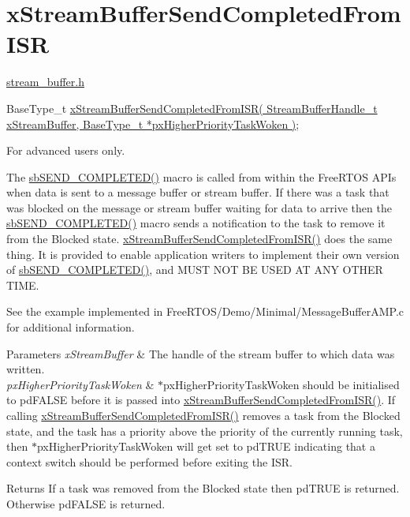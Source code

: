 \hypertarget{group__x_stream_buffer_send_completed_from_i_s_r}{}\section{x\+Stream\+Buffer\+Send\+Completed\+From\+I\+SR}
\label{group__x_stream_buffer_send_completed_from_i_s_r}
\hyperlink{stream__buffer_8h}{stream\+\_\+buffer.\+h}


\begin{DoxyPre}
BaseType\_t \hyperlink{stream__buffer_8h_abc37189e4eb8618f5434ae333dd50b23}{xStreamBufferSendCompletedFromISR( StreamBufferHandle\_t xStreamBuffer, BaseType\_t *pxHigherPriorityTaskWoken )};
\end{DoxyPre}


For advanced users only.

The \hyperlink{stream__buffer_8c_aa75273dfbcd92710254df0165ae1da5d}{sb\+S\+E\+N\+D\+\_\+\+C\+O\+M\+P\+L\+E\+T\+E\+D()} macro is called from within the Free\+R\+T\+OS A\+P\+Is when data is sent to a message buffer or stream buffer. If there was a task that was blocked on the message or stream buffer waiting for data to arrive then the \hyperlink{stream__buffer_8c_aa75273dfbcd92710254df0165ae1da5d}{sb\+S\+E\+N\+D\+\_\+\+C\+O\+M\+P\+L\+E\+T\+E\+D()} macro sends a notification to the task to remove it from the Blocked state. \hyperlink{stream__buffer_8h_abc37189e4eb8618f5434ae333dd50b23}{x\+Stream\+Buffer\+Send\+Completed\+From\+I\+S\+R()} does the same thing. It is provided to enable application writers to implement their own version of \hyperlink{stream__buffer_8c_aa75273dfbcd92710254df0165ae1da5d}{sb\+S\+E\+N\+D\+\_\+\+C\+O\+M\+P\+L\+E\+T\+E\+D()}, and M\+U\+ST N\+OT BE U\+S\+ED AT A\+NY O\+T\+H\+ER T\+I\+ME.

See the example implemented in Free\+R\+T\+O\+S/\+Demo/\+Minimal/\+Message\+Buffer\+A\+M\+P.\+c for additional information.


\begin{DoxyParams}{Parameters}
{\em x\+Stream\+Buffer} & The handle of the stream buffer to which data was written.\\
\hline
{\em px\+Higher\+Priority\+Task\+Woken} & $\ast$px\+Higher\+Priority\+Task\+Woken should be initialised to pd\+F\+A\+L\+SE before it is passed into \hyperlink{stream__buffer_8h_abc37189e4eb8618f5434ae333dd50b23}{x\+Stream\+Buffer\+Send\+Completed\+From\+I\+S\+R()}. If calling \hyperlink{stream__buffer_8h_abc37189e4eb8618f5434ae333dd50b23}{x\+Stream\+Buffer\+Send\+Completed\+From\+I\+S\+R()} removes a task from the Blocked state, and the task has a priority above the priority of the currently running task, then $\ast$px\+Higher\+Priority\+Task\+Woken will get set to pd\+T\+R\+UE indicating that a context switch should be performed before exiting the I\+SR.\\
\hline
\end{DoxyParams}
\begin{DoxyReturn}{Returns}
If a task was removed from the Blocked state then pd\+T\+R\+UE is returned. Otherwise pd\+F\+A\+L\+SE is returned. 
\end{DoxyReturn}
